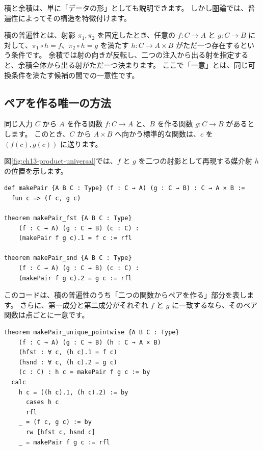 積と余積は、単に「データの形」としても説明できます。
しかし圏論では、普遍性によってその構造を特徴付けます。

積の普遍性とは、射影 \(\pi_1,\pi_2\) を固定したとき、任意の \(f:C\to A\) と \(g:C\to B\) に対して、\(\pi_1\circ h=f\)、\(\pi_2\circ h=g\) を満たす \(h:C\to A\times B\) がただ一つ存在するという条件です。
余積では射の向きが反転し、二つの注入から出る射を指定すると、余積全体から出る射がただ一つ決まります。
ここで「一意」とは、同じ可換条件を満たす候補の間での一意性です。

\subsection{ペアを作る唯一の方法}

同じ入力 \(C\) から \(A\) を作る関数 \(f : C \to A\) と、\(B\) を作る関数 \(g : C \to B\) があるとします。
このとき、\(C\) から \(A \times B\) へ向かう標準的な関数は、\(c\) を \((f(c), g(c))\) に送ります。

図\ref{fig:ch13-product-universal}では、\(f\) と \(g\) を二つの射影として再現する媒介射 \(h\) の位置を示します。


\begin{listing}[htbp]
\begin{verbatim}
def makePair {A B C : Type} (f : C → A) (g : C → B) : C → A × B :=
  fun c => (f c, g c)

theorem makePair_fst {A B C : Type}
    (f : C → A) (g : C → B) (c : C) :
    (makePair f g c).1 = f c := rfl

theorem makePair_snd {A B C : Type}
    (f : C → A) (g : C → B) (c : C) :
    (makePair f g c).2 = g c := rfl
\end{verbatim}
\caption{\texttt{makePair}}
\label{lst:ch13_product_universal}
\end{listing}

このコードは、積の普遍性のうち「二つの関数からペアを作る」部分を表します。
さらに、第一成分と第二成分がそれぞれ \(f\) と \(g\) に一致するなら、そのペア関数は点ごとに一意です。

\begin{listing}[htbp]
\begin{verbatim}
theorem makePair_unique_pointwise {A B C : Type}
    (f : C → A) (g : C → B) (h : C → A × B)
    (hfst : ∀ c, (h c).1 = f c)
    (hsnd : ∀ c, (h c).2 = g c)
    (c : C) : h c = makePair f g c := by
  calc
    h c = ((h c).1, (h c).2) := by
      cases h c
      rfl
    _ = (f c, g c) := by
      rw [hfst c, hsnd c]
    _ = makePair f g c := rfl
\end{verbatim}
\caption{\texttt{makePair\_unique\_pointwise}}
\label{lst:ch13_product_unique}
\end{listing}

